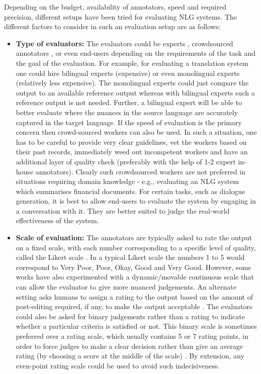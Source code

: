 Depending on the budget, availability of annotators, speed and required precision, different setups have been tried for evaluating NLG systems. The different factors to consider in such an evaluation setup are as follows:
\begin{itemize}
    \item \textbf{Type of evaluators:} The evaluators could be experts , crowdsourced annotators , or even end-users  depending on the requirements of the task and the goal of the evaluation. For example, for evaluating a translation system one could hire bilingual experts (expensive) or even monolingual experts (relatively less expensive). The monolingual experts could just compare the output to an available reference output whereas with bilingual experts such a reference output is not needed. Further, a bilingual expert will be able to better evaluate where the nuances in the source language are accurately captured in the target language. If the speed of evaluation is the primary concern then crowd-sourced workers can also be used. In such a situation, one has to be careful to provide very clear guidelines, vet the workers based on their past records, immediately weed out incompetent workers and have an additional layer of quality check (preferably with the help of 1-2 expert in-house annotators). Clearly such crowdsourced workers are not preferred in situations requiring domain knowledge - e.g., evaluating an NLG system which summarises financial documents. For certain tasks, such as dialogue generation, it is best to allow end-users to evaluate the system by engaging in a conversation with it. They are better suited to judge the real-world effectiveness of the system. 
    \item \textbf{Scale of evaluation:} The annotators are typically asked to rate the output on a fixed scale, with each number corresponding to a specific level of quality, called the Likert scale . In a typical Likert scale the numbers 1 to 5 would correspond to Very Poor, Poor, Okay, Good and Very Good. However, some works  have also experimented with a dynamic/movable continuous scale that can allow the evaluator to give more nuanced judgements. 
    An alternate setting asks humans to assign a rating to the output based on the amount of post-editing required, if any, to make the output acceptable . The evaluators could also be asked for binary judgements rather than a rating to indicate whether a particular criteria is satisfied or not. This binary scale is sometimes preferred over a rating scale, which usually contains 5 or 7 rating points, in order to force judges to make a clear decision rather than give an average rating (by choosing a score at the middle of the scale) . By extension, any even-point rating scale could be used to avoid such indecisiveness.

\end{itemize}
